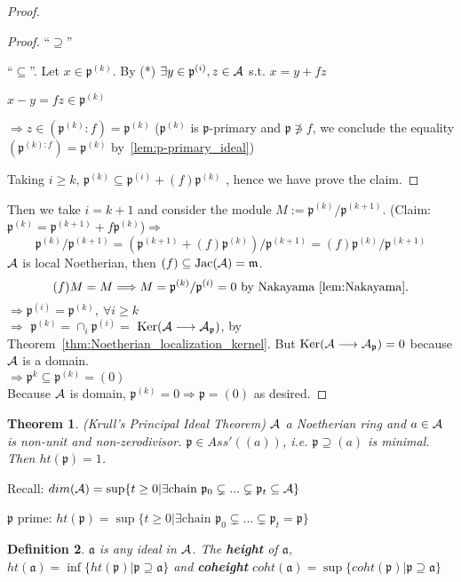 \documentclass[11pt]{article}
\newtheorem{thm}{Theorem}[section]
\newtheorem{dfn}[thm]{Definition}
\newcommand{\sca}{{\mathfrak a}}
\newcommand{\scm}{{\mathfrak m}}
\newcommand{\scp}{{\mathfrak p}}
\newcommand{\cala}{{\cal A}}
\newcommand{\Lrta}{\Longrightarrow}
\newcommand{\lrta}{\longrightarrow}
\begin{document}
\begin{proof}
\begin{proof}
``$\supseteq$'' \checkmark

``$\subseteq$''. Let $x\in\scp^{(k)}$. By (*) $\exists y\in\scp^{(i)},z\in\cala$ s.t. $x=y+fz$

$x-y=fz\in \scp^{(k)}$

$\Lrta z\in(\scp^{(k)}:f)=\scp^{(k)}$ ($\scp^{(k)}$ is $\scp$-primary and $\scp\not\ni f$, we conclude the equality $(\scp^{(k):f})=\scp^{(k)}$ by~\ref{lem:p-primary_ideal})

Taking $i\geq k$,
$
\scp^{(k)}\subseteq\scp^{(i)}+(f)\scp^{(k)}
$
, hence we have prove the claim.
\end{proof}

Then we take $i=k+1$ and consider the module $M:=\scp^{(k)}/\scp^{(k+1)}$.
(Claim:$\scp^{(k)}=\scp^{(k+1)}+f\scp^{(k)}$)$\Lrta$ 
$$
\scp^{(k)}/\scp^{(k+1)}=(\scp^{(k+1)}+(f)\scp^{(k)})/\scp^{(k+1)}=(f)\scp^{(k)}/\scp^{(k+1)}
$$
$\cala$ is local Noetherian, then
$(f)\subseteq \text{Jac}(\cala)=\scm$.
$$
(f)M=M\Lrta M=\scp^{(k)}/\scp^{(i)}=0\text{ by Nakayama~\ref{lem:Nakayama}}.\\
$$
$\Lrta\scp^{(i)}=\scp^{(k)},\ \forall i\geq k$\\
$\Lrta$ $\scp^{(k)}=\cap_i\scp^{(i)}=$  $\text{Ker}(\cala\lrta \cala_\scp)$, by Theorem~\ref{thm:Noetherian_localization_kernel}. 
But $\text{Ker}(\cala\lrta \cala_\scp)={0}$ because $\cala$ is a domain.\\
$\Lrta \scp^k\subseteq\scp^{(k)}=(0)$\\
Because $\cala$ is domain, $\scp^{(k)}=0\Lrta\scp=(0)$ as desired.
\end{proof}

\begin{thm}\label{thm:krull_principal}
(Krull's Principal Ideal Theorem) $\cala$ a Noetherian ring and $a\in \cala$ is non-unit and non-zerodivisor.
$\scp\in Ass'((a))$, i.e. $\scp\supseteq (a)$ is minimal. Then $ht(\scp)=1$.
\end{thm}
Recall: $dim(\cala)=\sup\{t\geq 0|\exists \text{chain } \scp_0\subsetneq...\subsetneq \scp_t\subseteq \cala\}$

$\scp$ prime: $ht(\scp)=\sup\{t\geq 0|\exists \text{chain } \scp_0\subsetneq...\subsetneq \scp_t=\scp\}$
\begin{dfn}$\sca$ is any ideal in $\cala$. The \textbf{height} of $\sca$, $ht(\sca)=\inf\{ht(\scp)|\scp\supseteq\sca\}$
 and \textbf{coheight} $coht(\sca)=\sup\{coht(\scp)|\scp\supseteq \sca\}$
\end{dfn}
\end{document}
